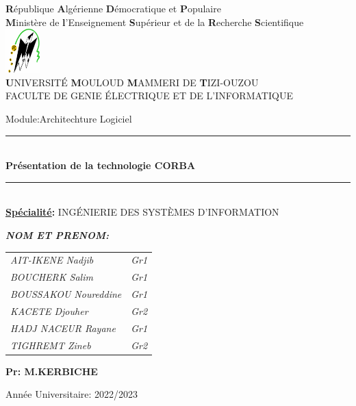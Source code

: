 \thispagestyle{empty}

\begin{center} 

\large \textbf{R}épublique \textbf{A}lgérienne \textbf{D}émocratique et \textbf{P}opulaire\\
\textbf{M}inistère de\textbf{ l}’Enseignement \textbf{S}upérieur et de la\textbf{ R}echerche \textbf{S}cientifique\\
\includegraphics[width=0.1\textwidth]{pdg/ummto.png}\\
\textbf{U}NIVERSITÉ \textbf{M}OULOUD \textbf{M}AMMERI DE \textbf{T}IZI-OUZOU\\ \vspace*{0.3cm}
FACULTE DE GENIE ÉLECTRIQUE ET DE L’INFORMATIQUE\\\vfill


\end{center}


\begin{center}
    \huge Module:Architechture Logiciel\normalsize\\
 
    \rule{0.90\textwidth}{2pt}\\
    \LARGE \textbf
    {Présentation de la technologie \textbf{CORBA}}\\
    \normalsize
    \rule{0.90\textwidth}{2pt}\\
    \textbf{\underline{Spécialité}:} \large INGÉNIERIE DES SYSTÈMES D'INFORMATION \\
  \end{center}
    \vfill
    
    
    \begin{flushleft}   
      \large\emph{\textbf{NOM ET PRENOM:}}\\ \vspace*{0.2cm}
      \begin{tabular}{ll}
        \hline 
        \emph{AIT-IKENE Nadjib}    & \small\textit{Gr1} \\ 
        \emph{BOUCHERK Salim}   &  \small\textit{Gr1}\\
        \emph{BOUSSAKOU Noureddine} &\small\textit{Gr1}\\
        \emph{KACETE Djouher} &\small\textit{Gr2} \\
        \emph{HADJ NACEUR Rayane} &  \small\textit{Gr1}\\
        \emph{TIGHREMT Zineb} & \small\textit{Gr2}\\
        \hline 
      \end{tabular}
    \end{flushleft}
    \vfill 
    \begin{flushright}
     \large \textbf {Pr: M.KERBICHE} \\
    \end{flushright}
  \vfill

\begin{flushright}
\large Année Universitaire: 2022/2023\\
\end{flushright}
   
    
%